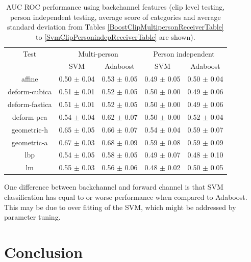 \begin{table}[tb] %
\centering
\caption{\ac{AUC} \ac{ROC} performance using backchannel features (clip level testing, person independent testing, average score of categories and average standard deviation from Tables \ref{BoostClipMultipersonReceiverTable} to \ref{SvmClipPersonindepReceiverTable} are shown).}
\begin{tabular}{ c | c | c | c | c }
\hline
Test & \multicolumn{2}{c|}{Multi-person} & \multicolumn{2}{c}{Person independent} \\
 & SVM & Adaboost & SVM & Adaboost \\
\hline
affine                           & 0.50 $\pm$ 0.04 & 0.53 $\pm$ 0.05 & 0.49 $\pm$ 0.05 & 0.50 $\pm$ 0.04 \\
deform-cubica                    & 0.51 $\pm$ 0.01 & 0.52 $\pm$ 0.05 & 0.50 $\pm$ 0.00 & 0.49 $\pm$ 0.06 \\
deform-fastica                   & 0.51 $\pm$ 0.01 & 0.52 $\pm$ 0.05 & 0.50 $\pm$ 0.00 & 0.49 $\pm$ 0.06 \\
deform-pca                       & 0.54 $\pm$ 0.04 & 0.62 $\pm$ 0.07 & 0.50 $\pm$ 0.00 & 0.52 $\pm$ 0.04 \\
geometric-h                      & 0.65 $\pm$ 0.05 & 0.66 $\pm$ 0.07 & 0.54 $\pm$ 0.04 & 0.59 $\pm$ 0.07 \\
\rowcolor[gray]{.95} geometric-a & 0.67 $\pm$ 0.03 & 0.68 $\pm$ 0.09 & 0.59 $\pm$ 0.08 & 0.59 $\pm$ 0.09 \\
lbp                              & 0.54 $\pm$ 0.05 & 0.58 $\pm$ 0.05 & 0.49 $\pm$ 0.07 & 0.48 $\pm$ 0.10 \\
lm                               & 0.55 $\pm$ 0.03 & 0.56 $\pm$ 0.06 & 0.48 $\pm$ 0.02 & 0.50 $\pm$ 0.05 \\
\hline
\end{tabular}
\label{TableBackchannel}
\end{table}

One difference between backchannel and forward channel is that \ac{SVM} classification has equal to or worse performance when compared to Adaboost. This may be due to over fitting of the SVM, which might be addressed by parameter tuning.


\section{Conclusion}

